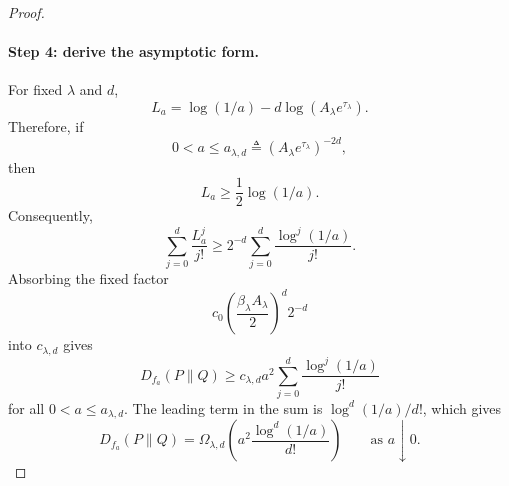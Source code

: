 \begin{proof}
    \paragraph{Step 4: derive the asymptotic form.}
    For fixed $\lambda$ and $d$,
    \[
        L_a
        =
        \log(1/a)
        -
        d\log(A_\lambda e^{\tau_\lambda}).
    \]
    Therefore, if
    \[
        0<a\le
        a_{\lambda,d}
        \triangleq
        (A_\lambda e^{\tau_\lambda})^{-2d},
    \]
    then
    \[
        L_a\ge \frac12\log(1/a).
    \]
    Consequently,
    \[
        \sum_{j=0}^d\frac{L_a^j}{j!}
        \ge
        2^{-d}
        \sum_{j=0}^d
        \frac{\log^j(1/a)}{j!}.
    \]
    Absorbing the fixed factor
    \[
        c_0
        \left(\frac{\beta_\lambda A_\lambda}{2}\right)^d
        2^{-d}
    \]
    into $c_{\lambda,d}$ gives
    \[
        D_{f_a}(P\|Q)
        \ge
        c_{\lambda,d}
        a^2
        \sum_{j=0}^d
        \frac{\log^j(1/a)}{j!}
    \]
    for all $0<a\le a_{\lambda,d}$. The leading term in the sum is
    $\log^d(1/a)/d!$, which gives
    \[
        D_{f_a}(P\|Q)
        =
        \Omega_{\lambda,d}
        \left(
        a^2\frac{\log^d(1/a)}{d!}
        \right)
        \qquad\text{as }a\downarrow0.
    \]
\end{proof}